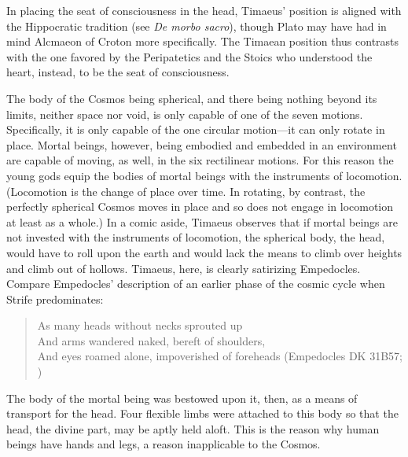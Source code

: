 In placing the seat of consciousness in the head, Timaeus' position is aligned with the Hippocratic tradition (see \emph{De morbo sacro}), though Plato may have had in mind Alcmaeon of Croton more specifically. The Timaean position thus contrasts with the one favored by the Peripatetics and the Stoics who understood the heart, instead, to be the seat of consciousness.

The body of the Cosmos being spherical, and there being nothing beyond its limits, neither space nor void, is only capable of one of the seven motions. Specifically, it is only capable of the one circular motion---it can only rotate in place. Mortal beings, however, being embodied and embedded in an environment are capable of moving, as well, in the six rectilinear motions. For this reason the young gods equip the bodies of mortal beings with the instruments of locomotion. (Locomotion is the change of place over time. In rotating, by contrast, the perfectly spherical Cosmos moves in place and so does not engage in locomotion at least as a whole.) In a comic aside, Timaeus observes that if mortal beings are not invested with the instruments of locomotion, the spherical body, the head, would have to roll upon the earth and would lack the means to climb over heights and climb out of hollows. Timaeus, here, is clearly satirizing Empedocles. Compare Empedocles' description of an earlier phase of the cosmic cycle when Strife predominates:
\begin{verse}
	As many heads without necks sprouted up\\
	And arms wandered naked, bereft of shoulders,\\
	And eyes roamed alone, impoverished of foreheads (Empedocles DK 31B57; \citealt[245]{Inwood:2001ve})
\end{verse}

The body of the mortal being was bestowed upon it, then, as a means of transport for the head. Four flexible limbs were attached to this body so that the head, the divine part, may be aptly held aloft. This is the reason why human beings have hands and legs, a reason inapplicable to the Cosmos. 

